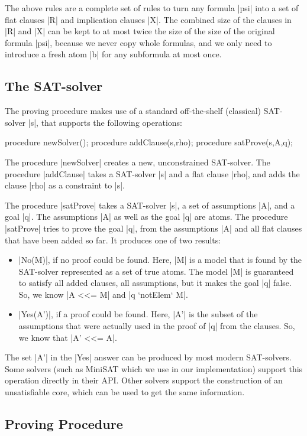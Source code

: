 \documentclass{llncs}
\begin{document}
The above rules are a complete set of rules to turn any formula |psi| into a set of flat clauses |R| and implication clauses |X|. The combined size of the clauses in |R| and |X| can be kept to at most twice the size of the size of the original formula |psi|, because we never copy whole formulas, and we only need to introduce a fresh atom |b| for any subformula at most once.

\subsection{The SAT-solver}

The proving procedure makes use of a standard off-the-shelf (classical) SAT-solver |s|, that supports the following operations:
\begin{code}
procedure newSolver();
procedure addClause(s,rho);
procedure satProve(s,A,q);
\end{code}
The procedure |newSolver| creates a new, unconstrained SAT-solver. The procedure |addClause| takes a SAT-solver |s| and a flat clause |rho|, and adds the clause |rho| as a constraint to |s|.

The procedure |satProve| takes a SAT-solver |s|, a set of assumptions |A|, and a goal |q|. The assumptions |A| as well as the goal |q| are atoms. The procedure |satProve| tries to prove the goal |q|, from the assumptions |A| and all flat clauses that have been added so far. It produces one of two results:
\begin{itemize}
\item |No(M)|, if no proof could be found. Here, |M| is a model that is found by the SAT-solver represented as a set of true atoms. The model |M| is guaranteed to satisfy all added clauses, all assumptions, but it makes the goal |q| false. So, we know |A <<= M| and |q `notElem` M|.
\item |Yes(A')|, if a proof could be found. Here, |A'| is the subset of the assumptions that were actually used in the proof of |q| from the clauses. So, we know that |A' <<= A|.
\end{itemize}
The set |A'| in the |Yes| answer can be produced by most modern SAT-solvers. Some solvers (such as MiniSAT \cite{minisat} which we use in our implementation) support this operation directly in their API. Other solvers support the construction of an unsatisfiable core, which can be used to get the same information.

\subsection{Proving Procedure}
\end{document}
